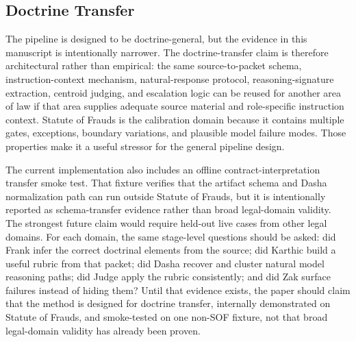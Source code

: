 \subsection{Doctrine Transfer}

The pipeline is designed to be doctrine-general, but the evidence in this
manuscript is intentionally narrower. The doctrine-transfer claim is therefore
architectural rather than empirical: the same source-to-packet schema,
instruction-context mechanism, natural-response protocol, reasoning-signature
extraction, centroid judging, and escalation logic can be reused for another
area of law if that area supplies adequate source material and role-specific
instruction context. Statute of Frauds is the calibration domain because it
contains multiple gates, exceptions, boundary variations, and plausible model
failure modes. Those properties make it a useful stressor for the general
pipeline design.

\begin{table}[h]
\centering
\caption{Doctrine-transfer argument and remaining validation burden.}
\label{tab:doctrine-transfer}

\end{table}

The current implementation also includes an offline contract-interpretation
transfer smoke test. That fixture verifies that the artifact schema and Dasha
normalization path can run outside Statute of Frauds, but it is intentionally
reported as schema-transfer evidence rather than broad legal-domain validity.
The strongest future claim would require held-out live cases from other legal
domains. For each domain, the same stage-level questions should be asked: did
Frank infer the correct doctrinal elements from the source; did Karthic build a
useful rubric from that packet; did Dasha recover and cluster natural model
reasoning paths; did Judge apply the rubric consistently; and did Zak surface
failures instead of hiding them? Until that evidence exists, the paper should
claim that the method is designed for doctrine transfer, internally demonstrated
on Statute of Frauds, and smoke-tested on one non-SOF fixture, not that broad
legal-domain validity has already been proven.
